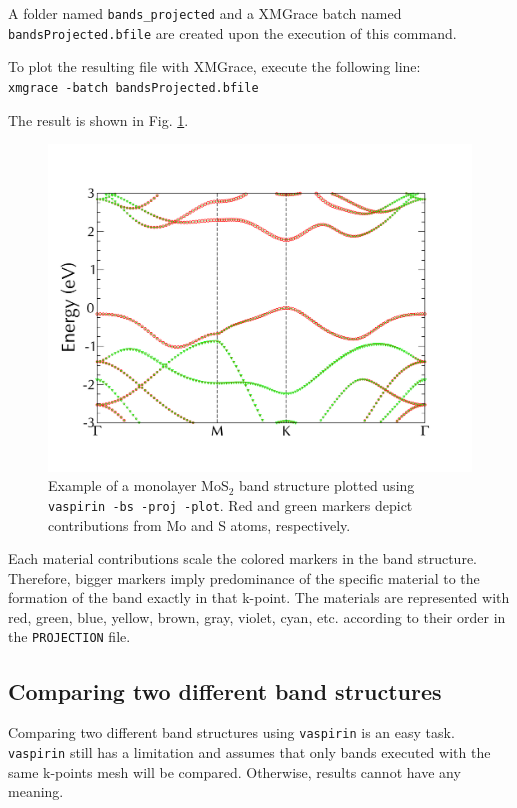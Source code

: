 \documentclass{refart}
\begin{document}
A folder named \texttt{bands\_projected} and a XMGrace batch named \texttt{bandsProjected.bfile} are created upon the execution of this command.

 To plot the resulting file with XMGrace, execute the following line:\\
\texttt{xmgrace -batch bandsProjected.bfile}

The result is shown in Fig. \ref{fig:bs-proj}.

\begin{figure}[h!]
	\centering
	\includegraphics[width=\textwidth]{img/bs-proj.pdf}
	\caption{Example of a monolayer MoS$_2$ band structure plotted using \texttt{vaspirin -bs -proj -plot}. Red and green markers depict contributions from Mo and S atoms, respectively.}
	\label{fig:bs-proj}
\end{figure}

 Each material contributions scale the colored markers in the band structure. Therefore, bigger markers imply predominance of the specific material to the formation of the band exactly in that k-point. The materials are represented with red, green, blue, yellow, brown, gray, violet, cyan, etc. according to their order in the \texttt{PROJECTION} file.

\subsection{Comparing two different band structures}

Comparing two different band structures using \texttt{vaspirin} is an easy task. \texttt{vaspirin} still has a limitation and assumes that only bands executed with the same k-points mesh will be compared. Otherwise, results cannot have any meaning.
\end{document}
